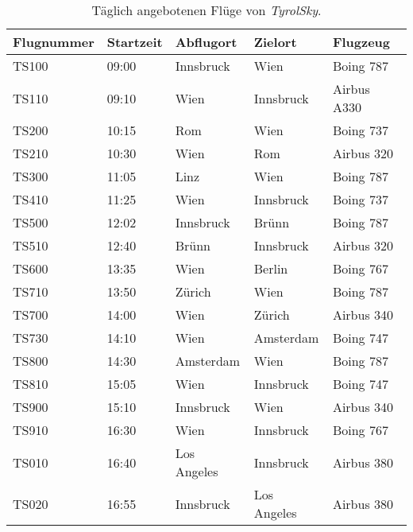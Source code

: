 \begin{table}
    \centering
    \begin{tabular}{lllll}
    Flugnummer & Startzeit  & Abflugort         & Zielort       & Flugzeug        \\ \hline   %
        TS100   & 09:00     & Innsbruck         & Wien          &  Boing 787      \\           %
        TS110   & 09:10     & Wien              & Innsbruck     &  Airbus A330    \\           %
        TS200   & 10:15     & Rom               & Wien          &  Boing 737      \\           %
        TS210   & 10:30     & Wien          	& Rom           &  Airbus 320     \\           %
        TS300   & 11:05     & Linz              & Wien          &  Boing 787      \\           %
        TS410   & 11:25     & Wien              & Innsbruck     &  Boing 737      \\           %
        TS500   & 12:02     & Innsbruck         & Brünn         &  Boing 787      \\           %
        TS510   & 12:40     & Brünn             & Innsbruck     &  Airbus 320     \\           %
        TS600   & 13:35     & Wien              & Berlin        &  Boing 767      \\           %
        TS710   & 13:50     & Zürich            & Wien          &  Boing 787      \\           %
        TS700   & 14:00     & Wien              & Zürich        &  Airbus 340     \\           %
        TS730   & 14:10     & Wien              & Amsterdam     &  Boing 747      \\           %
        TS800   & 14:30     & Amsterdam         & Wien          &  Boing 787      \\           %
        TS810   & 15:05     & Wien              & Innsbruck     &  Boing 747      \\           %
        TS900   & 15:10     & Innsbruck         & Wien          &  Airbus 340     \\           %
        TS910   & 16:30     & Wien              & Innsbruck     &  Boing 767      \\           %
        TS010   & 16:40     & Los Angeles       & Innsbruck     &  Airbus 380     \\           %
        TS020   & 16:55     & Innsbruck         & Los Angeles   &  Airbus 380     \\          %
    \end{tabular}
    \caption{Täglich angebotenen Flüge von \textit{TyrolSky}.}
    \label{tab:TyrolSky:destinations}
\end{table}

